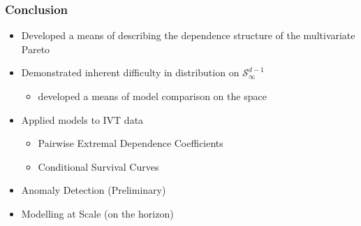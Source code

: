 \documentclass[aspectratio=169]{beamer}
\begin{document}
\begin{frame}
  \frametitle{Conclusion}
  \begin{itemize}
    \item Developed a means of describing the dependence structure of the multivariate Pareto
    \item Demonstrated inherent difficulty in distribution on $\mathcal{S}_{\infty}^{d-1}$
      \begin{itemize}
        \item developed a means of model comparison on the space
      \end{itemize}
    \item Applied models to IVT data
      \begin{itemize}
        \item Pairwise Extremal Dependence Coefficients
        \item Conditional Survival Curves
      \end{itemize}
    \item Anomaly Detection (Preliminary)
    \item Modelling at Scale (on the horizon)
  \end{itemize}
\end{frame}
\end{document}
